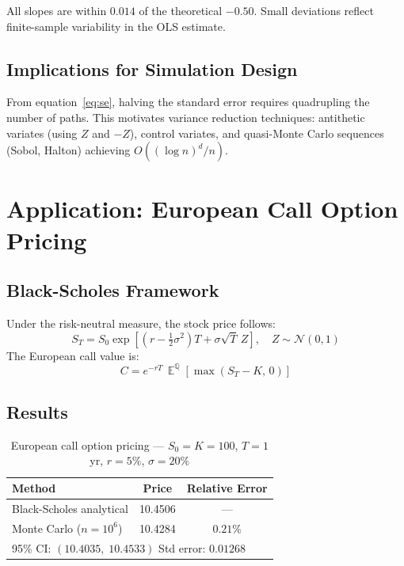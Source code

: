 \documentclass[12pt,a4paper]{article}
\DeclareMathOperator{\E}{\mathbb{E}}
\begin{document}
All slopes are within $0.014$ of the theoretical $-0.50$. Small deviations reflect
finite-sample variability in the OLS estimate.

\subsection{Implications for Simulation Design}

From equation~\eqref{eq:se}, halving the standard error requires quadrupling the number of
paths. This motivates variance reduction techniques: antithetic variates (using $Z$ and $-Z$),
control variates, and quasi-Monte Carlo sequences (Sobol, Halton) achieving $O((\log n)^d/n)$.

\section{Application: European Call Option Pricing}

\subsection{Black-Scholes Framework}

Under the risk-neutral measure, the stock price follows:
\[
  S_T = S_0\exp\!\left[\left(r-\tfrac{1}{2}\sigma^2\right)T+\sigma\sqrt{T}\,Z\right],
  \quad Z\sim\mathcal{N}(0,1)
\]
The European call value is:
\[
  C = e^{-rT}\,\E^{\mathbb{Q}}\!\left[\max(S_T-K,\,0)\right]
\]

\subsection{Results}

\begin{table}[H]
\centering
\caption{European call option pricing --- $S_0{=}K{=}100$, $T{=}1$yr, $r{=}5\%$, $\sigma{=}20\%$}
\renewcommand{\arraystretch}{1.3}
\begin{tabular}{lcc}
\toprule
\textbf{Method} & \textbf{Price} & \textbf{Relative Error}\\
\midrule
Black-Scholes analytical  & 10.4506 & ---\\
Monte Carlo ($n=10^6$)    & 10.4284 & $0.21\%$\\
\midrule
\multicolumn{3}{l}{\small 95\% CI: $(10.4035,\;10.4533)$ \quad Std error: $0.01268$}\\
\bottomrule
\end{tabular}
\end{table}
\end{document}
